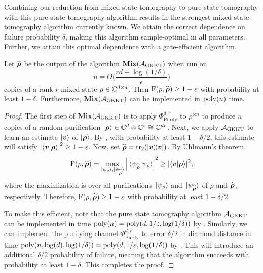 \documentclass{article}
\newcommand{\mixed}{\textup{\textbf{Mix}}}
\newcommand{\gkkt}{\calA_{\mathrm{GKKT}}}
\newcommand{\purifychan}{\Phi_{\mathrm{Purify}}}
\newcommand{\reg}[1]{\mathsf{#1}}
\begin{document}
Combining our reduction from mixed state tomography to pure state tomography with this pure state tomography algorithm results in the strongest mixed state tomography algorithm currently known.
We attain the correct dependence on failure probability $\delta$, making this algorithm sample-optimal in all parameters.
Further, we attain this optimal dependence with a gate-efficient algorithm.

\begin{theorem}
    \label{thm:efficient-mixed}
    Let $\widehat{\boldsymbol{\rho}}$ be the output of the algorithm $\mixed(\gkkt)$ when run on
    \begin{equation*}
        n = O\Big(\frac{rd + \log(1/\delta)}{\epsilon}\Big)
    \end{equation*}
    copies of a rank-$r$ mixed state $\rho \in \mathbb C^{d\times d}$.
    Then $\mathrm{F}(\rho, \widehat{\boldsymbol{\rho}}) \geq 1 - \varepsilon$ with probability at least $1 - \delta$.
    Furthermore, $\mixed(\gkkt)$ can be implemented in $\operatorname{poly}(n)$ time.
\end{theorem}

\begin{proof}%
    The first step of $\mixed(\gkkt)$ is to apply $\purifychan^{d,r}$ to $\rho^{\otimes n}$ to produce $n$ copies of a random purification $\ket{\boldsymbol{\rho}} \in \mathbb C^d \otimes \mathbb C^r \cong \mathbb C^{dr}$.
    Next, we apply $\gkkt$ to learn an estimate $\ket{\boldsymbol{v}}$ of $\ket{\boldsymbol{\rho}}$.
    By , with probability at least $1-\delta/2$, this estimate will satisfy $\abs{\braket{\boldsymbol{v}}{\boldsymbol{\rho}}}^2 \geq 1 - \varepsilon$.
    Now, set $\widehat{\brho} = \tr_{\reg{2}}(\ketbra{\bv})$.
    By Uhlmann's theorem,
    \begin{equation*}
        \mathrm{F}(\rho, \widehat{\boldsymbol{\rho}})
        = \max_{\ket*{\psi_{\rho}}, \ket*{\psi_{\widehat{\boldsymbol{\rho}}}}} \abs{\braket*{\psi_{\widehat{\boldsymbol{\rho}}}}{\psi_{\rho}}}^2
        \geq \abs{\braket{\boldsymbol{v}}{\boldsymbol{\rho}}}^2,
    \end{equation*}
    where the maximization is over all purifications $\ket*{\psi_{\rho}}$ and $\ket*{\psi_{\widehat{\boldsymbol{\rho}}}}$ of $\rho$ and $\widehat{\boldsymbol{\rho}}$, respectively.
    Therefore, $\mathrm{F}(\rho, \widehat{\boldsymbol{\rho}}) \geq 1-\varepsilon$ with probability at least $1 - \delta/2$.

    To make this efficient, note that the pure state tomography algorithm $\gkkt$ can be implemented in time $\operatorname{poly}(n) = \operatorname{poly}(d, 1/\varepsilon, \log(1/\delta))$ by  .
    Similarly, we can implement the purifying channel $\purifychan^{d, r}$ to error $\delta/2$ in diamond distance in time $\operatorname{poly}(n, \log(d), \log(1/\delta)) = \operatorname{poly}(d, 1/\varepsilon, \log(1/\delta))$ by .
    This will introduce an additional $\delta/2$ probability of failure, meaning that the algorithm succeeds with probability at least $1-\delta$.
    This completes the proof.
\end{proof}
\end{document}

